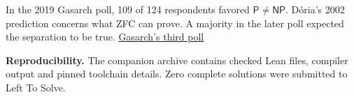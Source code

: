 \documentclass[12pt]{article}
\newcommand{\src}[2]{\href{#1}{#2}}\newcommand{\diag}{\operatorname{diag}}
\begin{document}
In the 2019 Gasarch poll, 109 of 124 respondents favored $\mathsf P\ne\mathsf{NP}$. D\'oria's 2002 prediction concerns what ZFC can prove. A majority in the later poll expected the separation to be true. \src{https://www.cs.umd.edu/users/gasarch/papers/poll3.pdf}{Gasarch's third poll}

\textbf{Reproducibility.} The companion archive contains checked Lean files, compiler output and pinned toolchain details. Zero complete solutions were submitted to Left To Solve.
\end{document}
